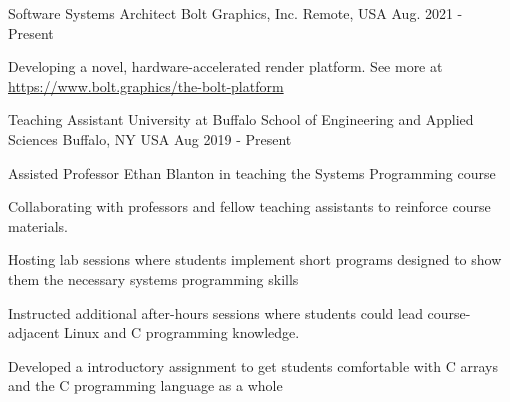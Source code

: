 

\begin{cventries}
  \cventry
    {Software Systems Architect} %
    {Bolt Graphics, Inc.} %
    {Remote, USA} %
    {Aug. 2021 - Present} %
    {
      \begin{cvitems} %
        \item {Developing a novel, hardware-accelerated render platform. See more at \url{https://www.bolt.graphics/the-bolt-platform}}
      \end{cvitems}
    }
    

  \cventry
    {Teaching Assistant} %
    {University at Buffalo School of Engineering and Applied Sciences} %
    {Buffalo, NY USA} %
    {Aug 2019 - Present} %
    {
      \begin{cvitems} %
        \item Assisted Professor Ethan Blanton in teaching the Systems Programming course
        \item Collaborating with professors and fellow teaching assistants to reinforce course materials.
        \item Hosting lab sessions where students implement short programs designed to show them the necessary systems programming skills
        \item Instructed additional after-hours sessions where students could lead course-adjacent Linux and C programming knowledge.
        \item Developed a introductory assignment to get students comfortable with C arrays and the C programming language as a whole
      \end{cvitems}
    }



\end{cventries}
